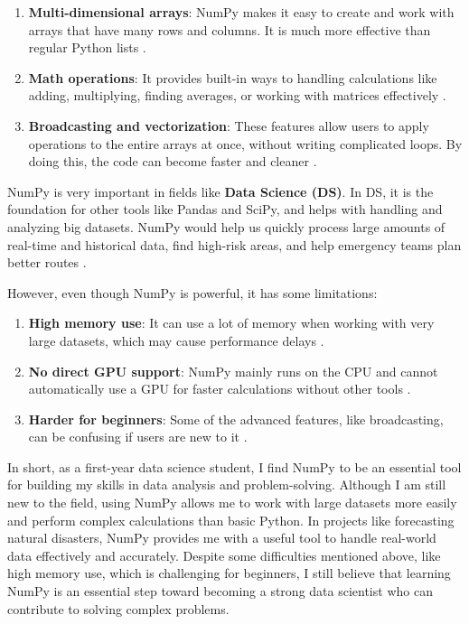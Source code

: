 \documentclass[a4paper, 11pt]{report}
\begin{document}
\begin{enumerate}
    \item \textbf{Multi-dimensional arrays}: NumPy makes it easy to create and work with arrays that have many rows and columns. It is much more effective than regular Python lists \cite{harris2020}.
    \item \textbf{Math operations}: It provides built-in ways to handling calculations like adding, multiplying, finding averages, or working with matrices effectively \cite{harris2020}.
    \item \textbf{Broadcasting and vectorization}: These features allow users to apply operations to the entire arrays at once, without writing complicated loops. By doing this, the code can become faster and cleaner \cite{harris2020}.
\end{enumerate}

NumPy is very important in fields like \textbf{Data Science (DS)}. In DS, it is the foundation for other tools like Pandas and SciPy, and helps with handling and analyzing big datasets. NumPy would help us quickly process large amounts of real-time and historical data, find high-risk areas, and help emergency teams plan better routes \cite{idris2013}.

However, even though NumPy is powerful, it has some limitations:

\begin{enumerate}
    \item \textbf{High memory use}: It can use a lot of memory when working with very large datasets, which may cause performance delays \cite{idris2015}.
    \item \textbf{No direct GPU support}: NumPy mainly runs on the CPU and cannot automatically use a GPU for faster calculations without other tools \cite{idris2015}.
    \item \textbf{Harder for beginners}: Some of the advanced features, like broadcasting, can be confusing if users are new to it \cite{idris2015}.
\end{enumerate}

In short, as a first-year data science student, I find NumPy to be an essential tool for building my skills in data analysis and problem-solving. Although I am still new to the field, using NumPy allows me to work with large datasets more easily and perform complex calculations than basic Python. In projects like forecasting natural disasters, NumPy provides me with a useful tool to handle real-world data effectively and accurately. Despite some difficulties mentioned above, like high memory use, which is challenging for beginners, I still believe that learning NumPy is an essential step toward becoming a strong data scientist who can contribute to solving complex problems.
\end{document}
